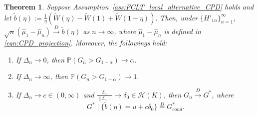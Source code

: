 \documentclass[11pt]{article}
\theoremstyle{plain}
\newtheorem{theorem}{Theorem}[section]
\theoremstyle{definition}
\theoremstyle{remark}
\begin{document}
\begin{theorem}\label{thm:CPD_asymptotic_power}
    Suppose Assumption~\ref{ass:FCLT_local_alternative_CPD} holds and let $\tilde{b}(\eta):=\frac{1}{\eta}( \tilde{W}(\eta)-\tilde{W}(1)+\tilde{W}(1-\eta)).$ Then, under $\{H'_{1n}\}_{n=1}^{\infty}$,  $\sqrt{n}(\hat{\mu}_1-\hat{\mu}_n)\overset{D}{\to} \tilde{b}(\eta)$ as $n\to \infty$, where  $\hat{\mu}_1-\hat{\mu}_n$ is defined in \eqref{eqn:CPD_projection}. Moreover, the followings hold:
    \begin{enumerate}
        \item If $\Delta_n\to 0$, then $\mathbb{P}(G_n>G_{1-\alpha})\to \alpha.$
        \item If $\Delta_n\to \infty$, then $\mathbb{P}(G_n>G_{1-\alpha})\to 1.$
        \item If $\Delta_n\to c\in(0,\infty)$ and $\frac{\delta_n}{\left\|\delta_n\right\|}\to \delta_0\in \mathcal{H}(K)$, then $G_n \overset{D}{\to} G^*$, where
        \[G^*\mid \{\tilde{b}(\eta)=u+c\delta_0\}\overset{D}{=}G^*_{cond}.\]
    \end{enumerate}
\end{theorem}
\end{document}
